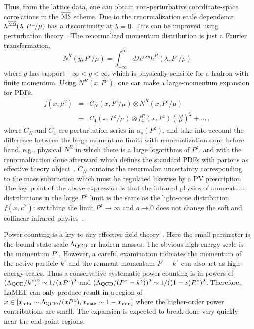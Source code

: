 \documentclass[prd,aps,twocolumn,preprintnumbers,showpacs,nofootinbib,superscriptaddress,notitlepage]{revtex4-2}
\begin{document}
Thus, from the lattice data, one can obtain non-perturbative coordinate-space correlations in the  $\overline{\rm MS}$ scheme. 
Due to the renormalization scale dependence $h^{\overline {\rm MS}}(\lambda, P^z/\mu)$ has a discontinuity at $\lambda=0$. This can be improved using perturbation theory~\cite{Izubuchi:2018srq}. The renormalized momentum distribution is just a Fourier transformation,  
\begin{equation}
N^R(y,P^z/\mu) = \int^\infty_{-\infty}
d\lambda e^{i\lambda y}
h^R(\lambda, P^z/\mu)
\end{equation}
where $y$ has support $-\infty<y<\infty$, which is physically sensible for a hadron with finite momentum. Using $N^R(x,P^z)$, one can make  a large-momentum expansion for PDFs,
\begin{eqnarray}
   f(x,\mu^2) &=& C_N(x,P^z/\mu)\otimes N^R(x, P^z/\mu) \nonumber \\
        &+& C_4(x, P^z/\mu)\otimes f_{4}^R(x, P^z) \left(\frac{M}{P^z}\right)^2
        + ... \ , 
\end{eqnarray}
where $C_N$ and $C_4$ are perturbation series in $\alpha_s(P^z)$, and take into account the difference between the large momentum limits with renormalization done before hand, e.g., physical $N^R$ in which there is a large logarithms of $P^z$, and with the renormalization done afterward which defines the standard PDFs with partons as effective theory object~\cite{Ji:2014gla}. $C_N$ contains the renormalon uncertainty corresponding to the mass subtraction \cite{Braun:2018brg} which must be regulated likewise by a PV prescription. The key point of the above expression is that the infrared physics of momentum distributions in the large $P^z$ limit is the same as the light-cone distribution $f(x,\mu^2)$: switching the limit $P^z\to\infty$ and $a\to 0$ 
does not change the soft and collinear infrared physics~\cite{Ji:2014gla}. 

Power counting is a key to any effective field theory~\cite{Weinberg:2021exr}.
Here the small parameter is the bound state scale $\Lambda_{\rm QCD}$ or hadron masses. 
The obvious high-energy scale is the momentum $P^z$.
However, a careful examination indicates the momentum of the active particle $k^z$ and the remnant momentum $P^z-k^z$ can also act as
high-energy scales. Thus a conservative systematic power counting is in powers of $(\Lambda_{\rm QCD}/k^z)^2 \sim 1/(xP^z)^2$
and $(\Lambda_{\rm QCD}/(P^z-k^z))^2\sim 1/((1-x)P^z)^2$.
Therefore, LaMET can only produce 
result in a region of $x\in [x_{\rm min}\sim \Lambda_{\rm QCD}/(xP^z), x_{\rm max}\sim 1-x_{\rm min}]$ where the higher-order power contributions
are small. The expansion is expected to break done very quickly near the end-point regions.
\end{document}
